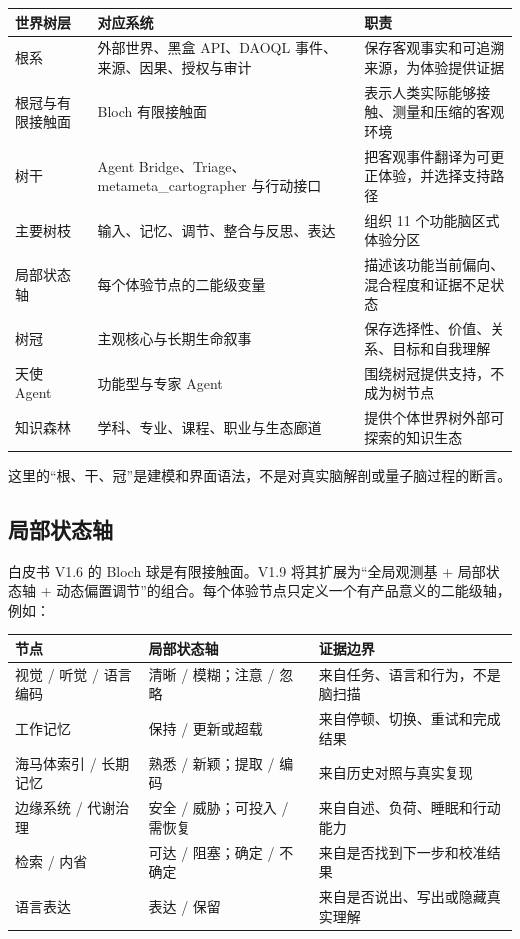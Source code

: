 \documentclass[UTF8,a4paper,11pt]{ctexart}
\begin{document}
\begin{center}
\begin{longtable}{@{}p{3.2cm}p{5.1cm}p{5.0cm}@{}}
\toprule
\textbf{世界树层} & \textbf{对应系统} & \textbf{职责} \\
\midrule
根系 & 外部世界、黑盒 API、DAOQL 事件、来源、因果、授权与审计 & 保存客观事实和可追溯来源，为体验提供证据 \\
根冠与有限接触面 & Bloch 有限接触面 & 表示人类实际能够接触、测量和压缩的客观环境 \\
树干 & Agent Bridge、Triage、metameta\_cartographer 与行动接口 & 把客观事件翻译为可更正体验，并选择支持路径 \\
主要树枝 & 输入、记忆、调节、整合与反思、表达 & 组织 11 个功能脑区式体验分区 \\
局部状态轴 & 每个体验节点的二能级变量 & 描述该功能当前偏向、混合程度和证据不足状态 \\
树冠 & 主观核心与长期生命叙事 & 保存选择性、价值、关系、目标和自我理解 \\
天使 Agent & 功能型与专家 Agent & 围绕树冠提供支持，不成为树节点 \\
知识森林 & 学科、专业、课程、职业与生态廊道 & 提供个体世界树外部可探索的知识生态 \\
\bottomrule
\end{longtable}
\end{center}

这里的“根、干、冠”是建模和界面语法，不是对真实脑解剖或量子脑过程的断言。

\subsection{局部状态轴}

白皮书 V1.6 的 Bloch 球是有限接触面。V1.9 将其扩展为“全局观测基 + 局部状态轴 + 动态偏置调节”的组合。每个体验节点只定义一个有产品意义的二能级轴，例如：

\begin{center}
\begin{longtable}{@{}p{4.3cm}p{4.0cm}p{5.0cm}@{}}
\toprule
\textbf{节点} & \textbf{局部状态轴} & \textbf{证据边界} \\
\midrule
视觉 / 听觉 / 语言编码 & 清晰 / 模糊；注意 / 忽略 & 来自任务、语言和行为，不是脑扫描 \\
工作记忆 & 保持 / 更新或超载 & 来自停顿、切换、重试和完成结果 \\
海马体索引 / 长期记忆 & 熟悉 / 新颖；提取 / 编码 & 来自历史对照与真实复现 \\
边缘系统 / 代谢治理 & 安全 / 威胁；可投入 / 需恢复 & 来自自述、负荷、睡眠和行动能力 \\
检索 / 内省 & 可达 / 阻塞；确定 / 不确定 & 来自是否找到下一步和校准结果 \\
语言表达 & 表达 / 保留 & 来自是否说出、写出或隐藏真实理解 \\
\bottomrule
\end{longtable}
\end{center}
\end{document}
